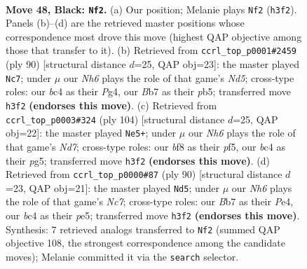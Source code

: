 \documentclass[11pt]{article}
\begin{document}
\clearpage

\begin{figure}[p]\centering
\begin{subfigure}{0.46\textwidth}\centering
\resizebox{\linewidth}{!}{%
\newchessgame
\chessboard[
  setfen={5B2/pb1p3r/8/5k2/2B5/6Rn/PPK5/8 b - - 17 48},
  showmover=false,
  pgfstyle=straightmove, color=movearrow, markmove={h3-f2}
]}
\caption{}
\end{subfigure}\hfill
\begin{subfigure}{0.46\textwidth}\centering
\resizebox{\linewidth}{!}{%
\newchessgame
\chessboard[
  setfen={8/6k1/8/pp1NR3/3r2PP/5K2/3b4/8 w - - 2 46},
  showmover=false,
  pgfstyle=straightmove, color=movearrow, markmove={d5-c7}
]}
\caption{}
\end{subfigure}
\\[4pt]
\begin{subfigure}{0.46\textwidth}\centering
\resizebox{\linewidth}{!}{%
\newchessgame
\chessboard[
  setfen={8/R2Nbk2/3r4/5pp1/8/4P3/5PK1/8 w - - 14 53},
  showmover=false,
  pgfstyle=straightmove, color=movearrow, markmove={d7-e5}
]}
\caption{}
\end{subfigure}\hfill
\begin{subfigure}{0.46\textwidth}\centering
\resizebox{\linewidth}{!}{%
\newchessgame
\chessboard[
  setfen={8/1rN2kp1/8/4p1P1/b3P3/2R3K1/8/8 w - - 4 46},
  showmover=false,
  pgfstyle=straightmove, color=movearrow, markmove={c7-d5}
]}
\caption{}
\end{subfigure}
\caption{\textbf{Move 48, Black: \texttt{Nf2}.} (a) Our position; Melanie plays \texttt{Nf2} (\texttt{h3f2}). Panels (b)--(d) are the retrieved master positions whose correspondence most drove this move (highest QAP objective among those that transfer to it). (b) Retrieved from \texttt{ccrl\_top\_p0001\#2459} (ply 90) [structural distance $d$=25, QAP obj=23]: the master played \texttt{Nc7}; under $\mu$ our \emph{Nh6} plays the role of that game's \emph{Nd5}; cross-type roles: our \emph{b}c4 as their \emph{P}g4, our \emph{B}b7 as their \emph{p}b5; transferred move \texttt{h3f2} \textbf{(endorses this move)}. (c) Retrieved from \texttt{ccrl\_top\_p0003\#324} (ply 104) [structural distance $d$=25, QAP obj=22]: the master played \texttt{Ne5+}; under $\mu$ our \emph{Nh6} plays the role of that game's \emph{Nd7}; cross-type roles: our \emph{b}f8 as their \emph{p}f5, our \emph{b}c4 as their \emph{p}g5; transferred move \texttt{h3f2} \textbf{(endorses this move)}. (d) Retrieved from \texttt{ccrl\_top\_p0000\#87} (ply 90) [structural distance $d$=23, QAP obj=21]: the master played \texttt{Nd5}; under $\mu$ our \emph{Nh6} plays the role of that game's \emph{Nc7}; cross-type roles: our \emph{B}b7 as their \emph{P}e4, our \emph{b}c4 as their \emph{p}e5; transferred move \texttt{h3f2} \textbf{(endorses this move)}. Synthesis: 7 retrieved analogs transferred to \texttt{Nf2} (summed QAP objective 108, the strongest correspondence among the candidate moves); Melanie committed it via the \texttt{search} selector.}
\label{fig:thought-m95}
\end{figure}
\end{document}
